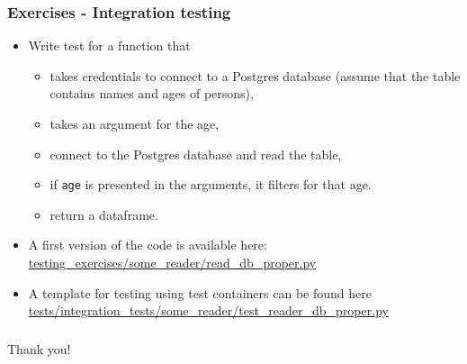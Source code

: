\documentclass[9pt,xcolor=dvipsnames]{beamer}
\begin{document}
\begin{frame}
  \frametitle{Exercises - Integration testing}
  \begin{itemize}
  \item Write test for a function that
    \begin{itemize}
    \item takes credentials to connect to a Postgres database (assume
      that the table contains names and ages of persons),
    \item takes an argument for the age,
    \item connect to the Postgres database and read the table,
    \item if {\tt age} is presented in the arguments, it filters for
      that age.
    \item return a dataframe.
    \end{itemize}
  \item A first version of the code is available here:
    \url{testing_exercises/some_reader/read_db_proper.py}
  \item A template for testing using test containers can be found here
    \url{tests/integration_tests/some_reader/test_reader_db_proper.py}
  \end{itemize}
  
\end{frame}

\begin{frame}
  \frametitle{}
  {\Large Thank you!}
\end{frame}
\end{document}
